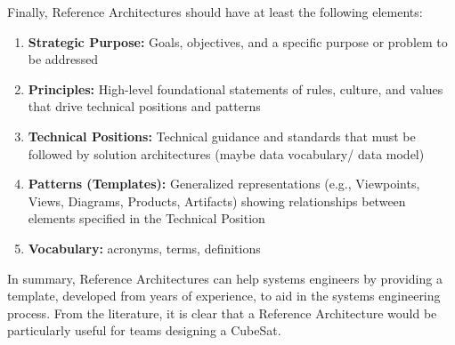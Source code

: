 Finally, Reference Architectures should have at least the following elements:
\begin{enumerate}
\item{\textbf{Strategic Purpose:} Goals, objectives, and a specific purpose or problem to be addressed}
\item{\textbf{Principles:} High-level foundational statements of rules, culture, and values that drive  technical positions and patterns}
\item{\textbf{Technical Positions:} Technical guidance and standards that must be followed by solution  architectures (maybe data vocabulary/ data model)}
\item{\textbf{Patterns (Templates):} Generalized representations (e.g., Viewpoints, Views, Diagrams, Products, Artifacts) showing relationships between elements specified in the Technical Position}
\item{\textbf{Vocabulary:} acronyms, terms, definitions}
\end{enumerate}

In summary, Reference Architectures can help systems engineers by providing a template, developed from years of experience, to aid in the systems engineering process. From the literature, it is clear that a Reference Architecture would be particularly useful for teams designing a CubeSat.


